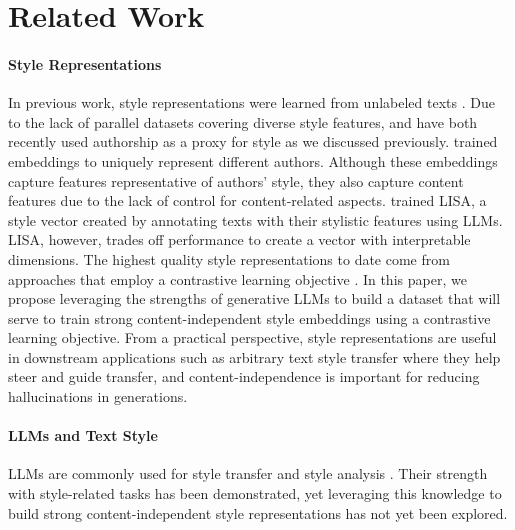 \wegmannvsstyledistancetable
\section{Related Work}
\label{sec:relatedwork}

\paragraph{Style Representations} In previous work, style representations were learned from unlabeled texts \citep[inter alia]{styletransfervector2,styletransfervector6,textsettr}. Due to the lack of parallel datasets covering diverse style features, \citet{deepstyle} and \citet{styleemb} have both recently used authorship as a proxy for style as we discussed previously. \citet{luar} trained
embeddings to uniquely represent different authors. Although these embeddings capture  features representative of authors' style, they also capture content features due to the lack of control for content-related aspects. \citet{lisa}  trained LISA, a style vector created by annotating texts with their stylistic features using LLMs. LISA, however, trades off performance to create a vector with interpretable dimensions. The highest quality style representations to date come from approaches that employ a contrastive learning objective \citep{styleemb}. In this paper, we propose leveraging the strengths of generative LLMs to build a dataset that will serve to train strong content-independent style embeddings using a contrastive learning objective.  From a practical perspective, style representations are useful in downstream applications such as arbitrary text style transfer \citep{learningtogenerate,paraguide,tinystyler} where they help steer and guide transfer, and content-independence is important for reducing hallucinations in generations.

\paragraph{LLMs and Text Style} LLMs are commonly used for style transfer \citep{reif,promptandrerank,lowresourceauthorshipstyletransfer,styleremix} and style analysis \citep{iclef,lisa}. Their strength with style-related tasks has been demonstrated, yet leveraging this knowledge to build strong content-independent style representations has not yet been explored.
